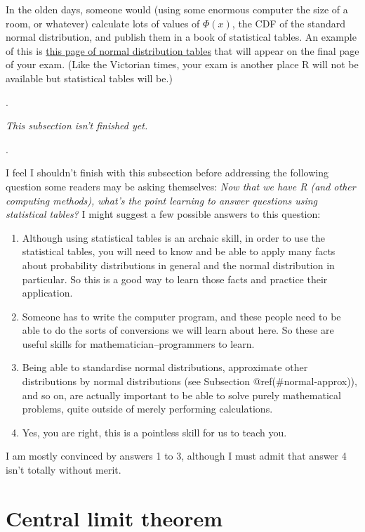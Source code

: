 \documentclass[
  a4paper,
]{book}
\providecommand{\tightlist}{%
  \setlength{\itemsep}{0pt}\setlength{\parskip}{0pt}}
\theoremstyle{definition}
\theoremstyle{definition}
\theoremstyle{definition}
\theoremstyle{definition}
\theoremstyle{remark}
\begin{document}
In the olden days, someone would (using some enormous computer the size of a room, or whatever) calculate lots of values of \(\Phi(x)\), the CDF of the standard normal distribution, and publish them in a book of statistical tables. An example of this is \href{https://mpaldridge.github.io/math1710/stat-tab.pdf}{this page of normal distribution tables} that will appear on the final page of your exam. (Like the Victorian times, your exam is another place R will not be available but statistical tables will be.)

.

\emph{This subsection isn't finished yet.}

.

I feel I shouldn't finish with this subsection before addressing the following question some readers may be asking themselves: \emph{Now that we have R (and other computing methods), what's the point learning to answer questions using statistical tables?} I might suggest a few possible answers to this question:

\begin{enumerate}
\def\labelenumi{\arabic{enumi}.}
\tightlist
\item
  Although using statistical tables is an archaic skill, in order to use the statistical tables, you will need to know and be able to apply many facts about probability distributions in general and the normal distribution in particular. So this is a good way to learn those facts and practice their application.
\item
  Someone has to write the computer program, and these people need to be able to do the sorts of conversions we will learn about here. So these are useful skills for mathematician--programmers to learn.
\item
  Being able to standardise normal distributions, approximate other distributions by normal distributions (see Subsection @ref(\#normal-approx)), and so on, are actually important to be able to solve purely mathematical problems, quite outside of merely performing calculations.
\item
  Yes, you are right, this is a pointless skill for us to teach you.
\end{enumerate}

I am mostly convinced by answers 1 to 3, although I must admit that answer 4 isn't totally without merit.

\hypertarget{clt}{%
\section{Central limit theorem}\label{clt}}
\end{document}
